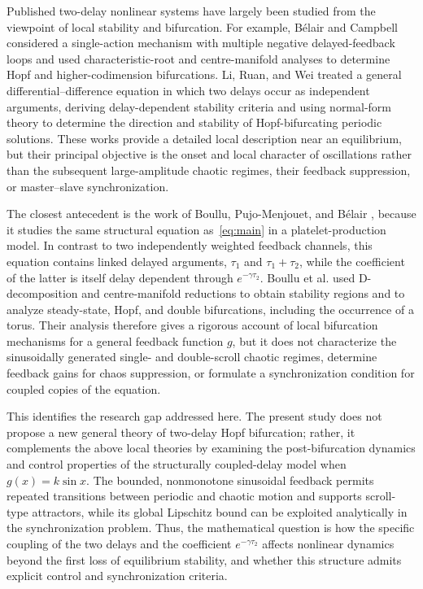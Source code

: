 \documentclass[11pt]{article}
\theoremstyle{remark}
\begin{document}
{
Published two-delay nonlinear systems have largely been studied from the viewpoint of local stability and bifurcation. For example, Bélair and Campbell \cite{belair1994stability} considered a single-action mechanism with multiple negative delayed-feedback loops and used characteristic-root and centre-manifold analyses to determine Hopf and higher-codimension bifurcations. Li, Ruan, and Wei \cite{li1999stability} treated a general differential--difference equation in which two delays occur as independent arguments, deriving delay-dependent stability criteria and using normal-form theory to determine the direction and stability of Hopf-bifurcating periodic solutions. These works provide a detailed local description near an equilibrium, but their principal objective is the onset and local character of oscillations rather than the subsequent large-amplitude chaotic regimes, their feedback suppression, or master--slave synchronization.

The closest antecedent is the work of Boullu, Pujo-Menjouet, and Bélair \cite{boullu2020stability}, because it studies the same structural equation as~\eqref{eq:main} in a platelet-production model. In contrast to two independently weighted feedback channels, this equation contains linked delayed arguments, $\tau_1$ and $\tau_1+\tau_2$, while the coefficient of the latter is itself delay dependent through $e^{-\gamma\tau_2}$. Boullu et al. used D-decomposition and centre-manifold reductions to obtain stability regions and to analyze steady-state, Hopf, and double bifurcations, including the occurrence of a torus. Their analysis therefore gives a rigorous account of local bifurcation mechanisms for a general feedback function $g$, but it does not characterize the sinusoidally generated single- and double-scroll chaotic regimes, determine feedback gains for chaos suppression, or formulate a synchronization condition for coupled copies of the equation.

This identifies the research gap addressed here. The present study does not propose a new general theory of two-delay Hopf bifurcation; rather, it complements the above local theories by examining the post-bifurcation dynamics and control properties of the structurally coupled-delay model when $g(x)=k\sin x$. The bounded, nonmonotone sinusoidal feedback permits repeated transitions between periodic and chaotic motion and supports scroll-type attractors, while its global Lipschitz bound can be exploited analytically in the synchronization problem. Thus, the mathematical question is how the specific coupling of the two delays and the coefficient $e^{-\gamma\tau_2}$ affects nonlinear dynamics beyond the first loss of equilibrium stability, and whether this structure admits explicit control and synchronization criteria.

}
\end{document}
